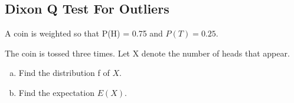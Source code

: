 \documentclass[a4paper,12pt]{article}
\begin{document}
\large 
\subsection*{Dixon Q Test For Outliers}


 A coin is weighted so that P(H) = 0.75 and $P(T ) = 0.25$.

The coin is tossed three times. Let X denote the number of
heads that appear.
\begin{enumerate}[(a)]
	\item  Find the distribution f of $X$.
	\item Find the expectation $E(X)$.
\end{enumerate}
\end{document}
